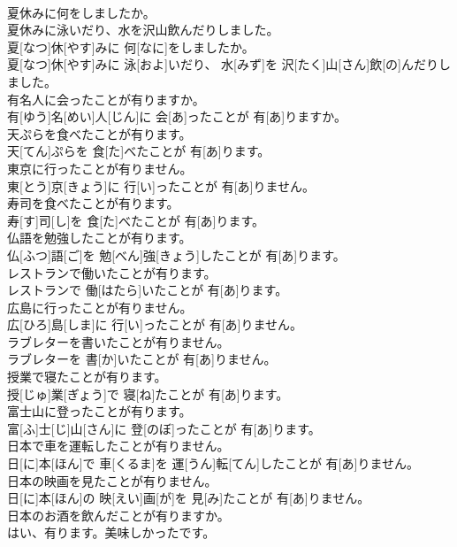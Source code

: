 \documentclass[8pt]{extreport}
\begin{document}
\begin{CJK}{UTF8}{min}
\\	夏休みに何をしましたか。 
\\	夏休みに泳いだり、水を沢山飲んだりしました。	
\\	夏[なつ]休[やす]みに 何[なに]をしましたか。 
\\	夏[なつ]休[やす]みに 泳[およ]いだり、 水[みず]を 沢[たく]山[さん]飲[の]んだりしました。
\\	有名人に会ったことが有りますか。	
\\	有[ゆう]名[めい]人[じん]に 会[あ]ったことが 有[あ]りますか。
\\	天ぷらを食べたことが有ります。	
\\	天[てん]ぷらを 食[た]べたことが 有[あ]ります。
\\	東京に行ったことが有りません。	
\\	東[とう]京[きょう]に 行[い]ったことが 有[あ]りません。
\\	寿司を食べたことが有ります。	
\\	寿[す]司[し]を 食[た]べたことが 有[あ]ります。
\\	仏語を勉強したことが有ります。	
\\	仏[ふつ]語[ご]を 勉[べん]強[きょう]したことが 有[あ]ります。
\\	レストランで働いたことが有ります。	
\\	レストランで 働[はたら]いたことが 有[あ]ります。
\\	広島に行ったことが有りません。	
\\	広[ひろ]島[しま]に 行[い]ったことが 有[あ]りません。
\\	ラブレターを書いたことが有りません。	
\\	ラブレターを 書[か]いたことが 有[あ]りません。
\\	授業で寝たことが有ります。	
\\	授[じゅ]業[ぎょう]で 寝[ね]たことが 有[あ]ります。
\\	富士山に登ったことが有ります。	
\\	富[ふ]士[じ]山[さん]に 登[のぼ]ったことが 有[あ]ります。
\\	日本で車を運転したことが有りません。	
\\	日[に]本[ほん]で 車[くるま]を 運[うん]転[てん]したことが 有[あ]りません。
\\	日本の映画を見たことが有りません。	
\\	日[に]本[ほん]の 映[えい]画[が]を 見[み]たことが 有[あ]りません。
\\	日本のお酒を飲んだことが有りますか。 
\\	はい、有ります。美味しかったです。	

\end{CJK}
\end{document}
